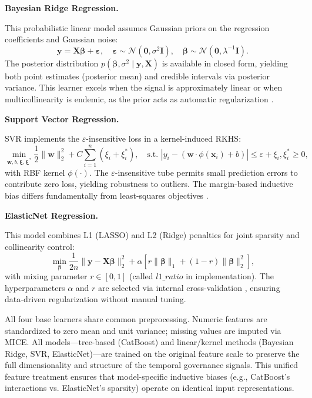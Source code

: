 \documentclass[12pt,a4paper]{article}
\begin{document}
\textbf{Bayesian Ridge Regression.} 

This probabilistic linear model assumes Gaussian priors on the regression coefficients and Gaussian noise:
\begin{equation}
\mathbf{y} = \mathbf{X}\boldsymbol{\beta} + \boldsymbol{\varepsilon}, \quad
\boldsymbol{\varepsilon} \sim \mathcal{N}(\mathbf{0}, \sigma^2 \mathbf{I}), \quad
\boldsymbol{\beta} \sim \mathcal{N}(\mathbf{0}, \lambda^{-1}\mathbf{I}).
\end{equation}
The posterior distribution $p(\boldsymbol{\beta}, \sigma^2 \mid \mathbf{y}, \mathbf{X})$ is available in closed form, yielding both point estimates (posterior mean) and credible intervals via posterior variance. This learner excels when the signal is approximately linear or when multicollinearity is endemic, as the prior acts as automatic regularization \citep{Bishop2006}.

\textbf{Support Vector Regression.} 

SVR implements the $\varepsilon$-insensitive loss in a kernel-induced RKHS:
\begin{equation}
\min_{\mathbf{w},b,\boldsymbol{\xi},\boldsymbol{\xi}^*} \frac{1}{2}\lVert \mathbf{w} \rVert_2^2 + C \sum_{i=1}^{n} (\xi_i + \xi_i^*),
\quad \text{s.t. } |y_i - (\mathbf{w} \cdot \phi(\mathbf{x}_i) + b)| \le \varepsilon + \xi_i, \xi_i^* \ge 0,
\end{equation}
with RBF kernel $\phi(\cdot)$. The $\varepsilon$-insensitive tube permits small prediction errors to contribute zero loss, yielding robustness to outliers. The margin-based inductive bias differs fundamentally from least-squares objectives \citep{Vapnik1995}.

\textbf{ElasticNet Regression.} 

This model combines L1 (LASSO) and L2 (Ridge) penalties for joint sparsity and collinearity control:
\begin{equation}
\min_{\boldsymbol{\beta}} \frac{1}{2n}\lVert \mathbf{y} - \mathbf{X}\boldsymbol{\beta} \rVert_2^2 + \alpha [r \lVert \boldsymbol{\beta} \rVert_1 + (1-r)\lVert \boldsymbol{\beta} \rVert_2^2],
\end{equation}
with mixing parameter $r \in [0,1]$ (called $l1\_ratio$ in implementation). The hyperparameters $\alpha$ and $r$ are selected via internal cross-validation \citep{Zou2005}, ensuring data-driven regularization without manual tuning.

All four base learners share common preprocessing. Numeric features are standardized to zero mean and unit variance; missing values are imputed via MICE. All models---tree-based (CatBoost) and linear/kernel methods (Bayesian Ridge, SVR, ElasticNet)---are trained on the original feature scale to preserve the full dimensionality and structure of the temporal governance signals. This unified feature treatment ensures that model-specific inductive biases (e.g., CatBoost's interactions vs. ElasticNet's sparsity) operate on identical input representations.
\end{document}
